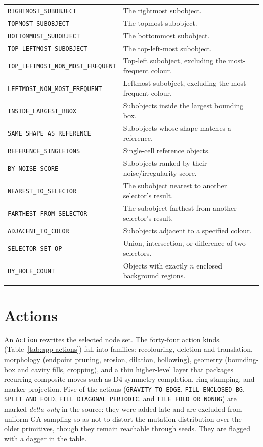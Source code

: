 \begin{table}[htbp]
\begin{tabular}{p{5.6cm}p{7.4cm}}
\texttt{RIGHTMOST\_SUBOBJECT} & The rightmost subobject. \\
\texttt{TOPMOST\_SUBOBJECT} & The topmost subobject. \\
\texttt{BOTTOMMOST\_SUBOBJECT} & The bottommost subobject. \\
\texttt{TOP\_LEFTMOST\_SUBOBJECT} & The top-left-most subobject. \\
\texttt{TOP\_LEFTMOST\_NON\_MOST\_FREQUENT} & Top-left subobject, excluding the most-frequent colour. \\
\texttt{LEFTMOST\_NON\_MOST\_FREQUENT} & Leftmost subobject, excluding the most-frequent colour. \\
\texttt{INSIDE\_LARGEST\_BBOX} & Subobjects inside the largest bounding box. \\
\texttt{SAME\_SHAPE\_AS\_REFERENCE} & Subobjects whose shape matches a reference. \\
\texttt{REFERENCE\_SINGLETONS} & Single-cell reference objects. \\
\texttt{BY\_NOISE\_SCORE} & Subobjects ranked by their noise/irregularity score. \\
\texttt{NEAREST\_TO\_SELECTOR} & The subobject nearest to another selector's result. \\
\texttt{FARTHEST\_FROM\_SELECTOR} & The subobject farthest from another selector's result. \\
\texttt{ADJACENT\_TO\_COLOR} & Subobjects adjacent to a specified colour. \\
\texttt{SELECTOR\_SET\_OP} & Union, intersection, or difference of two selectors. \\
\texttt{BY\_HOLE\_COUNT} & Objects with exactly $n$ enclosed background regions. \\
\noalign{\smallskip}\hline
\end{tabular}
\end{table}

\section{Actions}
\label{app:actions}

An \texttt{Action} rewrites the selected node set. The forty-four action kinds
(Table~\ref{tab:app-actions}) fall into families: recolouring, deletion and translation,
morphology (endpoint pruning, erosion, dilation, hollowing), geometry (bounding-box and
cavity fills, cropping), and a thin higher-level layer that packages recurring composite
moves such as D4-symmetry completion, ring stamping, and marker projection. Five of the
actions (\texttt{GRAVITY\_TO\_EDGE}, \texttt{FILL\_ENCLOSED\_BG},
\texttt{SPLIT\_AND\_FOLD}, \texttt{FILL\_DIAGONAL\_PERIODIC}, and
\texttt{TILE\_FOLD\_OR\_NONBG}) are marked \emph{delta-only} in the source: they were
added late and are excluded from uniform GA sampling so as not to distort the mutation
distribution over the older primitives, though they remain reachable through seeds. They
are flagged with a dagger in the table.

